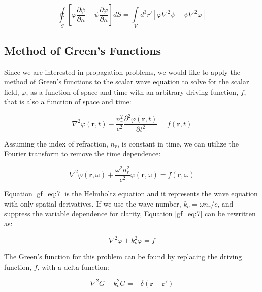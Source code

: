 \begin{equation}
\boxed{\oint\limits_{S} \left[ \varphi\frac{\partial \psi}{\partial n} - \psi\frac{\partial \varphi}{\partial n} \right]dS = \int\limits_{V}d^3r' \left[ \varphi\nabla^2\psi- \psi \nabla^2 \varphi\right]}
\label{gf_eq:5}
\end{equation}

\subsection {Method of Green's Functions} \label{gf_sec:method}
Since we are interested in propagation problems, we would like to apply the method of Green's functions to the scalar wave equation  to solve for the scalar field, $\varphi$, as a function of space and time with an arbitrary driving function, $f$, that is also a function of space and time:

\begin{equation}
\nabla^2\varphi\left(\mathbf{r},t\right) - \frac{n_r^2}{c^2}\frac{\partial^2 \varphi\left(\mathbf{r},t\right)}{\partial t^2} = f\left(\mathbf{r},t\right)
\label{gf_eq:6}
\end{equation}
\renewcommand{\baselinestretch}{2} \small\normalsize

\noindent Assuming the index of refraction, $n_r$, is constant in time, we can utilize the Fourier transform to remove the time dependence:

\begin{equation}
\nabla^2\varphi\left(\mathbf{r},\omega\right) + \frac{\omega^2n_r^2}{c^2}\varphi\left(\mathbf{r},\omega\right) = f\left(\mathbf{r},\omega\right)
\label{gf_eq:7}
\end{equation}
\renewcommand{\baselinestretch}{2} \small\normalsize

Equation \ref{gf_eq:7} is the Helmholtz equation and it represents the wave equation with only spatial derivatives. If we use the wave number, $k_o = \omega n_r/c$, and suppress the variable dependence for clarity, Equation \ref{gf_eq:7} can be rewritten as:

\begin{equation}
\nabla^2\varphi + k_o^2\varphi = f
\label{gf_eq:8}
\end{equation}
\renewcommand{\baselinestretch}{2} \small\normalsize

The Green's function for this problem can be found by replacing the driving function, $f$, with a delta function:

\begin{equation}
\nabla^2G+ k_o^2G = -\delta\left(\mathbf{r}-\mathbf{r}' \right)
\label{gf_eq:9}
\end{equation}
\renewcommand{\baselinestretch}{2} \small\normalsize


